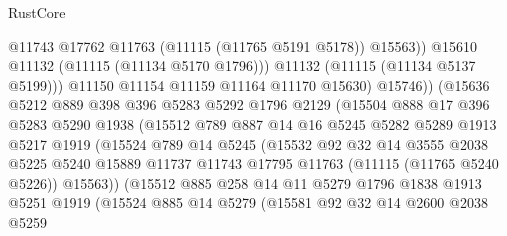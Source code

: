 \begin{lexlean}{RustCore}
\begin{coremodule}
                              @11743
                              @17762
                              @11763
                              (@11115 (@11765 @5191 @5178))
                              @15563))
                          @15610
                          @11132
                          (@11115 (@11134 @5170 @1796)))
                        @11132
                        (@11115 (@11134 @5137 @5199)))
                      @11150
                      @11154
                      @11159
                      @11164
                      @11170
                      @15630)
                    @15746))
                (@15636
                  @5212
                  @889
                  @398
                  @396
                  @5283
                  @5292
                  @1796
                  @2129
                  (@15504
                    @888
                    @17
                    @396
                    @5283
                    @5290
                    @1938
                    (@15512
                      @789
                      @887
                      @14
                      @16
                      @5245
                      @5282
                      @5289
                      @1913
                      @5217
                      @1919
                      (@15524
                        @789
                        @14
                        @5245
                        (@15532
                          @92
                          @32
                          @14
                          @3555
                          @2038
                          @5225
                          @5240
                          @15889
                          @11737
                          @11743
                          @17795
                          @11763
                          (@11115 (@11765 @5240 @5226))
                          @15563))
                      (@15512
                        @885
                        @258
                        @14
                        @11
                        @5279
                        @1796
                        @1838
                        @1913
                        @5251
                        @1919
                        (@15524
                          @885
                          @14
                          @5279
                          (@15581
                            @92
                            @32
                            @14
                            @2600
                            @2038
                            @5259

\end{coremodule}
\end{lexlean}
